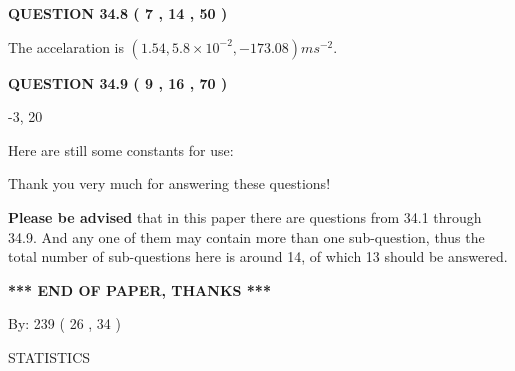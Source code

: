 \documentclass[12pt]{article}
\begin{document}
 
 
  
\vspace{0.2in}
  
{\textbf{\Large{QUESTION
34.8 
 (           7 ,          14 ,          50 )
}}}
  
  
 
 
\noindent{}
 
 
  The accelaration is $  %
(
1.54,
5.8 \times 10^{-2},
-173.08)
ms^{-2} $.
 
 
 
 
  
\vspace{0.2in}
  
{\textbf{\Large{QUESTION
34.9 
 (           9 ,          16 ,          70 )
}}}
  
  


 
 
\noindent{}

-3,  %
20
 
 
 
   
   
 \vspace{0.2in}
Here are still some constants for use:
 
 
 
 
Thank you very much for answering these questions!
 
{\textbf{\large{Please be advised}}} that in this paper there are questions from
34.1 through
34.9.
And any one of them may contain more than one sub-question, thus the total number
of sub-questions here is around 14, of which
13 should be answered.
 
   
   
   
   
\vspace{1.0in} 
{\textbf{\large{ *** END OF PAPER, THANKS *** }}} 
   
   
\hspace{1.0in} By: 
         239 (          26 ,           34 )
   
   
   
\vspace{0.2in}
\vspace{0.2in}
   
   
 \newpage
\setcounter{page}{1} 
   
   
 {\LARGE{STATISTICS}}
   
\vspace{0.2in}
   
\end{document}
